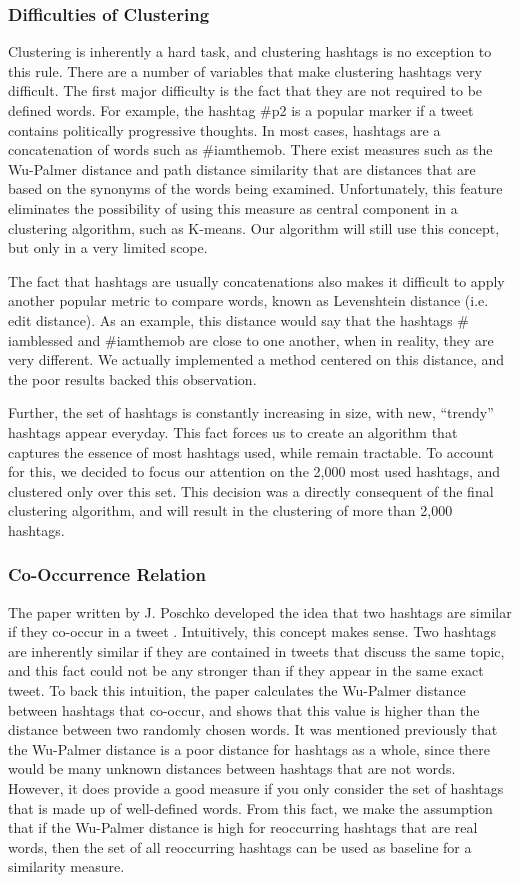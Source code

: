 \subsubsection{Difficulties of Clustering}
Clustering is inherently a hard task, and clustering hashtags is no exception to this rule. There are a number of variables that make clustering hashtags very difficult. The first major difficulty is the fact that they are not required to be defined words. For example, the hashtag $\#$p2 is a popular marker if a tweet contains politically progressive thoughts. In most cases, hashtags are a concatenation of words such as $\#$iamthemob. There exist measures such as the Wu-Palmer distance and path distance similarity that are distances that are based on the synonyms of the words being examined. Unfortunately, this feature eliminates the possibility of using this measure as central component in a clustering algorithm, such as K-means. Our algorithm will still use this concept, but only in a very limited scope.

The fact that hashtags are usually concatenations also makes it difficult to apply another popular metric to compare words, known as Levenshtein distance (i.e. edit distance). As an example, this distance would say that the hashtags $\#$iamblessed and $\#$iamthemob are close to one another, when in reality, they are very different. We actually implemented a method centered on this distance, and the poor results backed this observation.

Further, the set of hashtags is constantly increasing in size, with new, ``trendy'' hashtags appear everyday. This fact forces us to create an algorithm that captures the essence of most hashtags used, while remain tractable. To account for this, we decided to focus our attention on the 2,000 most used hashtags, and clustered only over this set. This decision was a directly consequent of the final clustering algorithm, and will result in the clustering of more than 2,000 hashtags.

\subsubsection{Co-Occurrence Relation}
The paper written by J. Poschko developed the idea that two hashtags are similar if they co-occur in a tweet \cite{Poschko2011}. Intuitively, this concept makes sense. Two hashtags are inherently similar if they are contained in tweets that discuss the same topic, and this fact could not be any stronger than if they appear in the same exact tweet. To back this intuition, the paper calculates the Wu-Palmer distance between hashtags that co-occur, and shows that this value is higher than the distance between two randomly chosen words. It was mentioned previously that the Wu-Palmer distance is a poor distance for hashtags as a whole, since there would be many unknown distances between hashtags that are not words. However, it does provide a good measure if you only consider the set of hashtags that is made up of well-defined words. From this fact, we make the assumption that if the Wu-Palmer distance is high for reoccurring hashtags that are real words, then the set of all reoccurring hashtags can be used as baseline for a similarity measure.


